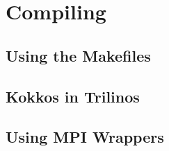 
\chapter{Compiling}
\section{Using the Makefiles}
\section{Kokkos in Trilinos}
\section{Using MPI Wrappers}
